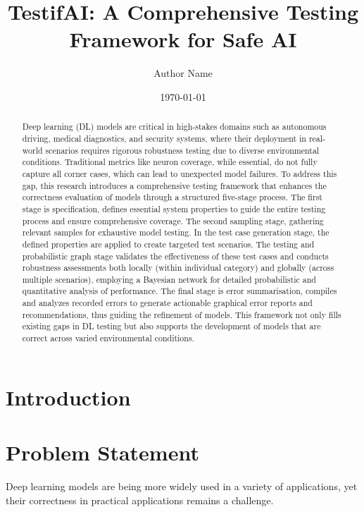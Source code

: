 \documentclass[10pt, conference, a4paper, final]{IEEEtran}
\title{TestifAI: A Comprehensive Testing Framework for Safe AI}
\author{Author Name}
\date{\today}
\begin{document}
\maketitle

\begin{abstract}

    Deep learning (DL) models are critical in high-stakes domains such as autonomous driving, medical diagnostics, and security systems, where their deployment in real-world scenarios requires rigorous robustness testing due to diverse environmental conditions. Traditional metrics like neuron coverage, while essential, do not fully capture all corner cases, which can lead to unexpected model failures. To address this gap, this research introduces a comprehensive testing framework that enhances the correctness evaluation of models through a structured five-stage process. The first stage is specification, defines essential system properties to guide the entire testing process and ensure comprehensive coverage. The second sampling stage, gathering relevant samples for exhaustive model testing. In the test case generation stage, the defined properties are applied to create targeted test scenarios. The testing and probabilistic graph stage validates the effectiveness of these test cases and conducts robustness assessments both locally (within individual category) and globally (across multiple scenarios), employing a Bayesian network for detailed probabilistic and quantitative analysis of performance. The final stage is error summarisation, compiles and analyzes recorded errors to generate actionable graphical error reports and recommendations, thus guiding the refinement of models. This framework not only fills existing gaps in DL testing but also supports the development of models that are correct across varied environmental conditions.
\end{abstract}


\section{Introduction}

\section{Problem Statement}

Deep learning models are being more widely used in a variety of applications, yet their correctness in practical applications remains a challenge.
\end{document}
